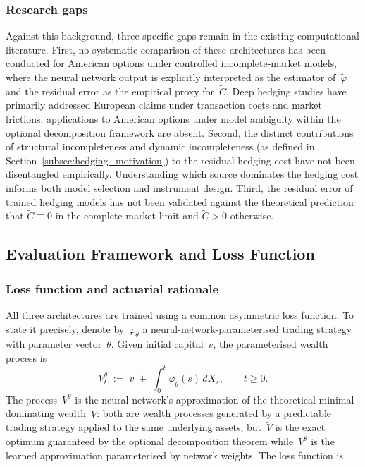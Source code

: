 \subsubsection*{Research gaps}
Against this background, three specific gaps remain in the existing
computational literature.  First, no systematic comparison of these
architectures has been conducted for American options under controlled
incomplete-market models, where the neural network output is explicitly
interpreted as the estimator of~$\tilde{\varphi}$ and the residual error
as the empirical proxy for~$\tilde{C}$.  Deep hedging studies have
primarily addressed European claims under transaction costs and market
frictions; applications to American options under model ambiguity within
the optional decomposition framework are absent.  Second, the distinct
contributions of structural incompleteness and dynamic incompleteness
(as defined in Section~\ref{subsec:hedging_motivation}) to the residual
hedging cost have not been disentangled empirically.  Understanding which
source dominates the hedging cost informs both model selection and
instrument design.  Third, the residual error of trained hedging models has
not been validated against the theoretical prediction that
$\tilde{C} \equiv 0$ in the complete-market limit and $\tilde{C} > 0$
otherwise.


\subsection{Evaluation Framework and Loss Function}
\label{subsec:loss_function}

\subsubsection{Loss function and actuarial rationale}
All three architectures are trained using a common asymmetric loss
function.  To state it precisely, denote by~$\varphi_\theta$ a
neural-network-parameterised trading strategy with parameter
vector~$\theta$.  Given initial capital~$v$, the parameterised wealth
process is
\begin{equation}
\label{eq:param_wealth}
V_t^\theta
\;:=\; v \;+\; \int_0^t \varphi_\theta(s) \, dX_s,
\qquad t \ge 0.
\end{equation}
The process~$V^\theta$ is the neural network's approximation of the
theoretical minimal dominating wealth~$\tilde{V}$: both are wealth
processes generated by a predictable trading strategy applied to the same
underlying assets, but~$\tilde{V}$ is the exact optimum guaranteed by the
optional decomposition theorem while~$V^\theta$ is the learned
approximation parameterised by network weights.  The loss function is

